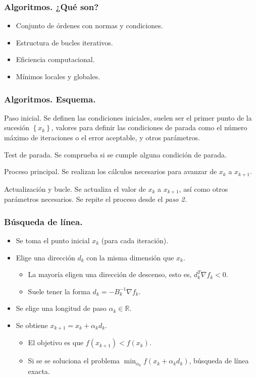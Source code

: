 \documentclass{beamer}
\newcommand{\sucesionxk}{\left\{x_k\right\}}
\begin{document}
\begin{frame}
    \frametitle{Algoritmos. ¿Qué son?} \pause
    \begin{itemize}[label=\textbullet]
        \item Conjunto de órdenes con normas y condiciones. \pause
        \item Estructura de bucles iterativos. \pause
        \item Eficiencia computacional. \pause
        \item Mínimos locales y globales.
    \end{itemize}
\end{frame}
\begin{frame}
    \frametitle{Algoritmos. Esquema.} \pause 
    \begin{steps}
		\item Paso inicial. Se definen las condiciones iniciales, suelen ser el primer
		punto de la sucesión $\sucesionxk$, valores para definir las condiciones de
		parada como el número máximo de iteraciones o el error aceptable, y otros parámetros.
        \pause
		\item Test de parada. Se comprueba si se cumple alguna condición de parada.
        \pause
		\item Proceso principal. Se realizan los cálculos necesarios para avanzar de
		$x_k$ a $x_{k+1}$.
        \pause
		\item Actualización y bucle. Se actualiza el valor de $x_k$ a $x_{k+1}$, así como otros parámetros necesarios. Se repite el proceso desde el \textit{paso 2.}
	\end{steps}
\end{frame}

\begin{frame}
    \frametitle{Búsqueda de línea.}
    \begin{itemize}[label=\textbullet]
        \item Se toma el punto inicial $x_k$ (para cada iteración).
        \item Elige una dirección $d_k$ con la misma dimensión que $x_k$.
        \begin{itemize}[label=-]
            \item La mayoría eligen una dirección de descenso, esto es, $d_k^T \nabla f_k < 0$.
            \item Suele tener la forma $d_k = -B_k^{-1}\nabla f_k$.
        \end{itemize}
        \item Se elige una longitud de paso $\alpha_k\in \mathbb{R}$.
        \item Se obtiene $x_{k+1} = x_k + \alpha_k d_k$.
        \begin{itemize}[label=-]
            \item El objetivo es que $f(x_{k+1}) < f(x_k)$.
            \item Si se se soluciona el problema $\min_{\alpha_k} f(x_k + \alpha_k d_k)$, búsqueda de línea exacta.
        \end{itemize}
    \end{itemize}
\end{frame}
\end{document}
